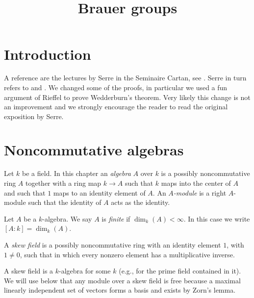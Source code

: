 

%


\title{Brauer groups}


\maketitle

\label{section-phantom}

\tableofcontents

\section{Introduction}
\label{section-introduction}

\noindent
A reference are the lectures by Serre in the Seminaire Cartan, see
\cite{Serre-Cartan}. Serre in turn refers to
\cite{Deuring} and \cite{ANT}. We changed some of the proofs, in particular
we used a fun argument of Rieffel to prove Wedderburn's theorem.
Very likely this change is not an improvement and we strongly
encourage the reader to read the original exposition by Serre.


\section{Noncommutative algebras}
\label{section-algebras}

\noindent
Let $k$ be a field. In this chapter an {\it algebra} $A$ over $k$ is
a possibly noncommutative ring $A$ together with a ring map
$k \to A$ such that $k$ maps into the center of $A$ and such that
$1$ maps to an identity element of $A$. An {\it $A$-module} is a right
$A$-module such that the identity of $A$ acts as the identity.

\begin{definition}
\label{definition-finite}
Let $A$ be a $k$-algebra. We say $A$ is {\it finite} if $\dim_k(A) < \infty$.
In this case we write $[A : k] = \dim_k(A)$.
\end{definition}

\begin{definition}
\label{definition-skew-field}
A {\it skew field} is a possibly noncommutative ring with an identity
element $1$, with $1 \not = 0$, such that in which every nonzero element
has a multiplicative inverse.
\end{definition}

\noindent
A skew field is a $k$-algebra for some $k$ (e.g., for the prime field
contained in it). We will use below that any module over a skew field
is free because a maximal linearly independent set of vectors forms a
basis and exists by Zorn's lemma.

